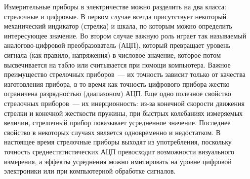 Измерительные приборы в электричестве можно разделить на два класса: стрелочные
и цифровые. В первом случае всегда присутствует некоторый механический индикатор
(стрелка) и шкала, по которым можно определить интересующее значение. Во втором
случае важную роль играет так называемый аналогово-цифровой преобразователь
(АЦП), который превращает уровень сигнала (как правило, напряжения) в числовое
значение, которое потом высвечивается на табло или считывается при помощи
компьютера. Важное преимущество стрелочных приборов~--- их точность зависит
только от качества изготовления прибора, в то время как точность цифрового
прибора жестко ограничена разрядностью (диапазоном) АЦП. Еще одно полезное
свойство стрелочных приборов~--- их инерционность: из-за конечной скорости
движения стрелки и конечной жесткости пружины, при быстрых колебаниях измеряемых
величин, стрелочный прибор показывает усредненное значение. Последнее свойство в
некоторых случаях является одновременно и недостатком. В настоящее время
стрелочные приборы выходят из употребления, поскольку точность
среднестатистических АЦП превосходит возможности визуального измерения, а
эффекты усреднения можно имитировать на уровне цифровой электроники или при
компьютерной обработке сигналов.
